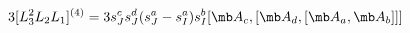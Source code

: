 \begin{equation}
3[L_3^2L_2L_1]^{(4)}=3s_{J}^{c} s_{J}^{d} ( s_{J}^{a}-s_I^a) s_I^b [{\mb A}_c,[{\mb A}_d,[{\mb A}_a,{\mb A}_b]]]
\end{equation}

